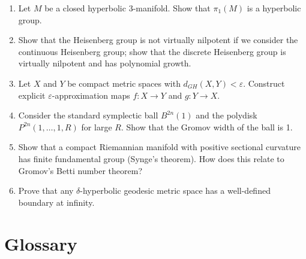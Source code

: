\begin{enumerate}
    \item [I] Let \(M\) be a closed hyperbolic 3-manifold. Show that \(\pi_1(M)\) is a hyperbolic group.
    \item [I] Show that the Heisenberg group is not virtually nilpotent if we consider the continuous Heisenberg group; show that the discrete Heisenberg group is virtually nilpotent and has polynomial growth.
    \item [I] Let \(X\) and \(Y\) be compact metric spaces with \(d_{GH}(X, Y) < \varepsilon\). Construct explicit \(\varepsilon\)-approximation maps \(f: X \to Y\) and \(g: Y \to X\).
    \item [I] Consider the standard symplectic ball \(B^{2n}(1)\) and the polydisk \(P^{2n}(1, \dots, 1, R)\) for large \(R\). Show that the Gromov width of the ball is 1.
    \item [I] Show that a compact Riemannian manifold with positive sectional curvature has finite fundamental group (Synge's theorem). How does this relate to Gromov's Betti number theorem?
    \item [B] Prove that any \(\delta\)-hyperbolic geodesic metric space has a well-defined boundary at infinity.
\end{enumerate}

\section*{Glossary}

